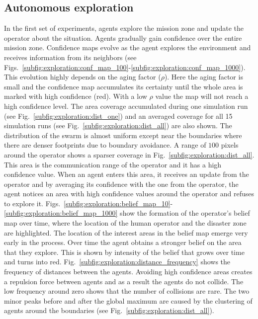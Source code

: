 \documentclass[runningheads]{llncs}%
\begin{document}
\subsection{Autonomous exploration}
In the first set of experiments, agents explore the mission zone and update the operator about the situation. Agents gradually gain confidence over the entire mission zone. Confidence maps evolve as the agent explores the environment and receives information from its neighbors (see Figs.~\ref{subfig:exploration:conf_map_100}-\ref{subfig:exploration:conf_map_1000}). This evolution highly depends on the aging factor ($\rho$). Here the aging factor is small and the confidence map accumulates its certainty until the whole area is marked with high confidence (red). With a low $\rho$ value the map will not reach a high confidence level. The area coverage accumulated during one simulation run (see Fig.~\ref{subfig:exploration:dist_one}) and an averaged coverage for all 15 simulation runs (see Fig.~\ref{subfig:exploration:dist_all}) are also shown. The distribution of the swarm is almost uniform except near the boundaries where there are denser footprints due to boundary avoidance. A range of $100$ pixels around the operator shows a sparser coverage in Fig.~\ref{subfig:exploration:dist_all}. This area is the communication range of the operator and it has a high confidence value. When an agent enters this area, it receives an update from the operator and by averaging its confidence with the one from the operator, the agent notices an area with high confidence values around the operator and refuses to explore it. Figs.~\ref{subfig:exploration:belief_map_10}-\ref{subfig:exploration:belief_map_1000} show the formation of the operator's belief map over time, where the location of the human operator and the disaster zone are highlighted. The location of the interest areas in the belief map emerge very early in the process. Over time the agent obtains a stronger belief on the area that they explore. This is shown by intensity of the belief that grows over time and turns into red. Fig.~\ref{subfig:exploration:distance_frequency} shows the frequency of distances between the agents. Avoiding high confidence areas creates a repulsion force between agents and as a result the agents do not collide. The low frequency around zero shows that the number of collisions are rare. The two minor peaks before and after the global maximum are caused by the clustering of agents around the boundaries (see Fig.~\ref{subfig:exploration:dist_all}). 
\end{document}
